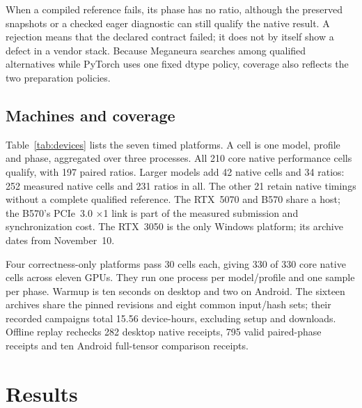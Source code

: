 \documentclass[conference]{IEEEtran}
\newcommand{\system}{Meganeura}
\begin{document}
When a compiled reference fails, its phase has no ratio, although the
preserved snapshots or a checked eager diagnostic can still qualify the
native result. A rejection means that the declared contract failed; it does
not by itself show a defect in a vendor stack. Because \system{} searches
among qualified alternatives while PyTorch uses one fixed dtype policy,
coverage also reflects the two preparation policies.

\subsection{Machines and coverage}

\begin{table}[t]
\caption{Measured GPU platforms and fully paired cells per phase, out of ten
planned on each platform. MI300X uses the experimental driver described in
Section~\ref{sec:availability}.}
\label{tab:devices}
\centering
\small
\setlength{\tabcolsep}{5pt}

\end{table}

Table~\ref{tab:devices} lists the seven timed platforms. A cell is one model,
profile and phase, aggregated over three processes. All 210 core native
performance cells qualify, with 197 paired ratios. Larger models add 42
native cells and 34 ratios: 252 measured native cells and 231 ratios in all.
The other 21 retain native timings without a complete qualified reference.
The RTX~5070 and B570 share a host; the B570's PCIe~3.0 $\times$1 link is
part of the measured submission and synchronization cost. The RTX~3050 is
the only Windows platform; its archive dates from November~10.

Four correctness-only platforms pass 30 cells each, giving 330 of 330 core
native cells across eleven GPUs. They run one process per model/profile and
one sample per phase. Warmup is ten seconds on desktop and two on Android.
The sixteen archives share the pinned revisions and eight common input/hash
sets; their recorded campaigns total 15.56 device-hours, excluding setup and
downloads. Offline replay rechecks 282 desktop native receipts, 795 valid
paired-phase receipts and ten Android full-tensor comparison receipts.

\section{Results}
\label{sec:results}

\begin{table}[t]
\caption{\system{}/PyTorch time ratios, median of three process medians.
Below one (bold), \system{} is faster. $^\dagger$No qualified PyTorch time;
the entry is \system{}'s time, qualified by its own checks.}
\label{tab:performance}
\centering
\small
\setlength{\tabcolsep}{4.5pt}

\end{table}
\end{document}
